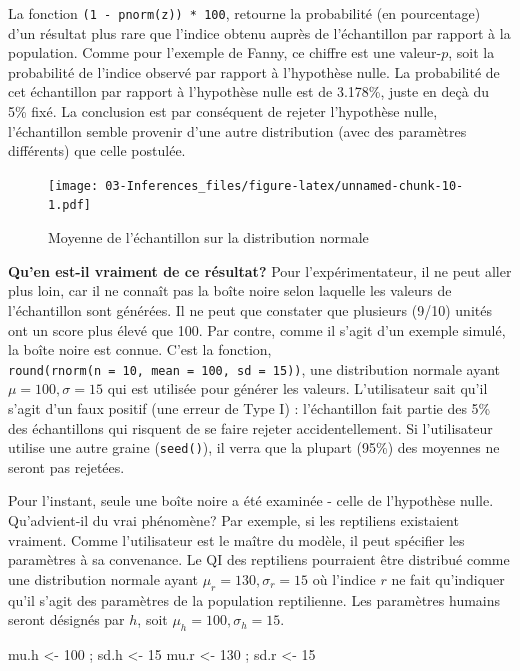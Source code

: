 \documentclass[
]{book}
\newenvironment{Shaded}{}{}
\newcommand{\DecValTok}[1]{#1}
\newcommand{\NormalTok}[1]{#1}
\newcommand{\OtherTok}[1]{#1}
\begin{document}
La fonction \texttt{(1\ -\ pnorm(z))\ *\ 100}, retourne la probabilité (en pourcentage) d'un résultat plus rare que l'indice obtenu auprès de l'échantillon par rapport à la population. Comme pour l'exemple de Fanny, ce chiffre est une valeur-\(p\), soit la probabilité de l'indice observé par rapport à l'hypothèse nulle. La probabilité de cet échantillon par rapport à l'hypothèse nulle est de 3.178\%, juste en deçà du 5\% fixé. La conclusion est par conséquent de rejeter l'hypothèse nulle, l'échantillon semble provenir d'une autre distribution (avec des paramètres différents) que celle postulée.

\begin{figure}
\centering
\texttt{[image: 03-Inferences\_files/figure-latex/unnamed-chunk-10-1.pdf]}
\caption{\label{fig:unnamed-chunk-10}Moyenne de l'échantillon sur la distribution normale}
\end{figure}

\textbf{Qu'en est-il vraiment de ce résultat?} Pour l'expérimentateur, il ne peut aller plus loin, car il ne connaît pas la boîte noire selon laquelle les valeurs de l'échantillon sont générées. Il ne peut que constater que plusieurs (9/10) unités ont un score plus élevé que 100. Par contre, comme il s'agit d'un exemple simulé, la boîte noire est connue. C'est la fonction, \texttt{round(rnorm(n\ =\ 10,\ mean\ =\ 100,\ sd\ =\ 15))}, une distribution normale ayant \(\mu=100,\sigma=15\) qui est utilisée pour générer les valeurs. L'utilisateur sait qu'il s'agit d'un faux positif (une erreur de Type I) : l'échantillon fait partie des 5\% des échantillons qui risquent de se faire rejeter accidentellement. Si l'utilisateur utilise une autre graine (\texttt{seed()}), il verra que la plupart (95\%) des moyennes ne seront pas rejetées.

Pour l'instant, seule une boîte noire a été examinée - celle de l'hypothèse nulle. Qu'advient-il du vrai phénomène? Par exemple, si les reptiliens existaient vraiment. Comme l'utilisateur est le maître du modèle, il peut spécifier les paramètres à sa convenance. Le QI des reptiliens pourraient être distribué comme une distribution normale ayant \(\mu_{r}=130, \sigma_r = 15\) où l'indice \(r\) ne fait qu'indiquer qu'il s'agit des paramètres de la population reptilienne. Les paramètres humains seront désignés par \(h\), soit \(\mu_h = 100,\sigma_h = 15\).

\begin{Shaded}
\begin{Highlighting}[]
\NormalTok{mu.h }\OtherTok{\textless{}{-}} \DecValTok{100}\NormalTok{ ; sd.h }\OtherTok{\textless{}{-}} \DecValTok{15}
\NormalTok{mu.r }\OtherTok{\textless{}{-}} \DecValTok{130}\NormalTok{ ; sd.r }\OtherTok{\textless{}{-}} \DecValTok{15}
\end{Highlighting}
\end{Shaded}
\end{document}
